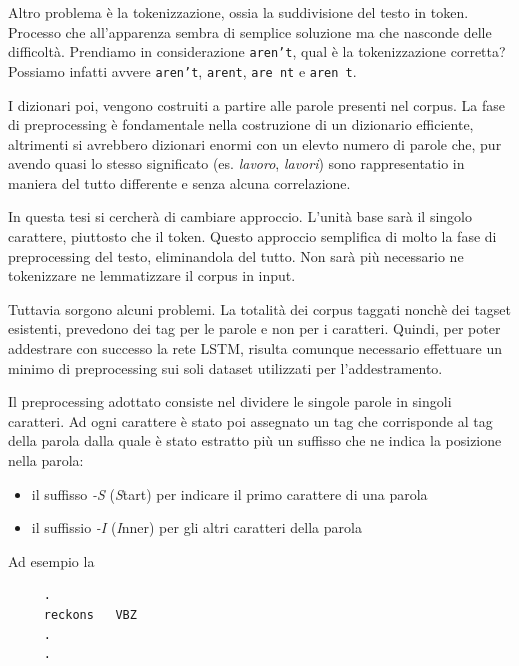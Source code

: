 Altro problema \`e la tokenizzazione, ossia la suddivisione del testo in token.
Processo che all'apparenza sembra di semplice soluzione ma che nasconde delle
difficolt\`a. Prendiamo in considerazione \texttt{aren't}, qual \`e la tokenizzazione
corretta? Possiamo infatti avvere \texttt{aren't}, \texttt{arent}, \texttt{are nt}
e \texttt{aren t}.

I dizionari poi, vengono costruiti a partire alle parole presenti nel corpus.
La fase di preprocessing \`e fondamentale nella costruzione di un dizionario
efficiente, altrimenti si avrebbero dizionari enormi con un elevto numero di
parole che, pur avendo quasi lo stesso significato (es. \emph{lavoro}, \emph{lavori})
sono rappresentatio in maniera del tutto differente e senza alcuna correlazione.

In questa tesi si cercher\`a di cambiare approccio. L'unit\`a base sar\`a il
singolo carattere, piuttosto che il token. Questo approccio semplifica di molto
la fase di preprocessing del testo, eliminandola del tutto. Non sar\`a pi\`u
necessario ne tokenizzare ne lemmatizzare il corpus in input.

Tuttavia sorgono alcuni problemi. La totalit\`a dei corpus taggati nonch\`e dei
tagset esistenti, prevedono dei tag per le parole e non per i caratteri. Quindi,
per poter addestrare con successo la rete LSTM, risulta comunque necessario
effettuare un minimo di preprocessing sui soli dataset utilizzati per l'addestramento.

Il preprocessing adottato consiste nel dividere le singole parole in singoli
caratteri. Ad ogni carattere \`e stato poi assegnato un tag che corrisponde al
tag della parola dalla quale \`e stato estratto pi\`u un suffisso che ne indica
la posizione nella parola:

\begin{itemize}
  \item il suffisso \emph{-S} (\emph{S}tart) per indicare il primo carattere di
        una parola
  \item il suffissio \emph{-I} (\emph{I}nner) per gli altri caratteri della parola
\end{itemize}

Ad esempio la

\begin{center}
  \begin{minipage}{5cm}
    \begin{verbatim}
     .
     reckons   VBZ
     .
     .
    \end{verbatim}
  \end{minipage}
\end{center}

